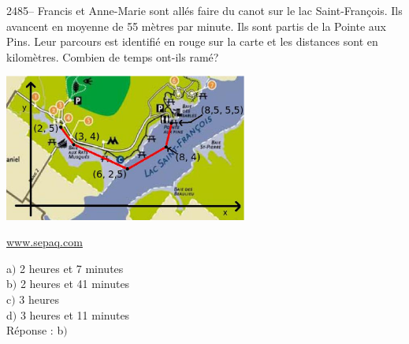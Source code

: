 \documentclass[letterpaper, 12pt]{article}
\begin{document}
2485--  Francis et Anne-Marie sont all\'es faire du canot sur le lac Saint-Fran\c cois. Ils avancent en moyenne de 55 m\`etres par minute. Ils sont partis de la Pointe aux Pins. Leur parcours est identifi\'e en rouge sur la carte et les distances sont en kilom\`etres. Combien de temps ont-ils ram\'e?\\
\begin{center}
 \includegraphics[width=8cm,bb=14 14 604 370]{Q2485.eps}
\end{center}
\begin{center}
\underline{www.sepaq.com}
\end{center}
a$)$ 2 heures et 7 minutes\\
b$)$ 2 heures et 41 minutes\\
c$)$ 3 heures\\
d$)$ 3 heures et 11 minutes\\


R\'eponse : b$)$\\
\end{document}
